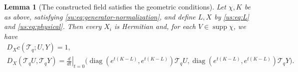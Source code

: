 \documentclass[11pt]{article}
\numberwithin{equation}{section}
\newtheorem{lemma}[theorem]{Lemma}
\theoremstyle{remark}
\newcommand{\diag}{\operatorname{diag}}
\newcommand{\supp}{\operatorname{supp}}
\begin{document}
\begin{lemma}[The constructed field satisfies the geometric conditions]
\label{su:lem:field-geometry}
Let $\chi,K$ be as above, satisfying \eqref{su:eq:generator-normalization},
and define $L,X$ by \eqref{us:eq:L} and \eqref{us:eq:physical}.
Then every $X_i$ is Hermitian and, for each $V\in\supp\chi$, we have
\begin{equation}\label{su:eq:field-geometry}
 \begin{gathered}
 D_Xc(\mathcal T_q;U,Y)=1,\\
 D_X(\mathcal T_q U,\mathcal T_q Y)=\left.\frac{d}{dt}\right|_{t=0}
 \bigl(\diag(e^{t(K-L)},e^{t(K-L)})\mathcal T_q U,
       \diag(e^{t(K-L)},e^{t(K-L)})\mathcal T_q Y\bigr).
 \end{gathered}
\end{equation}
\end{lemma}
\end{document}
